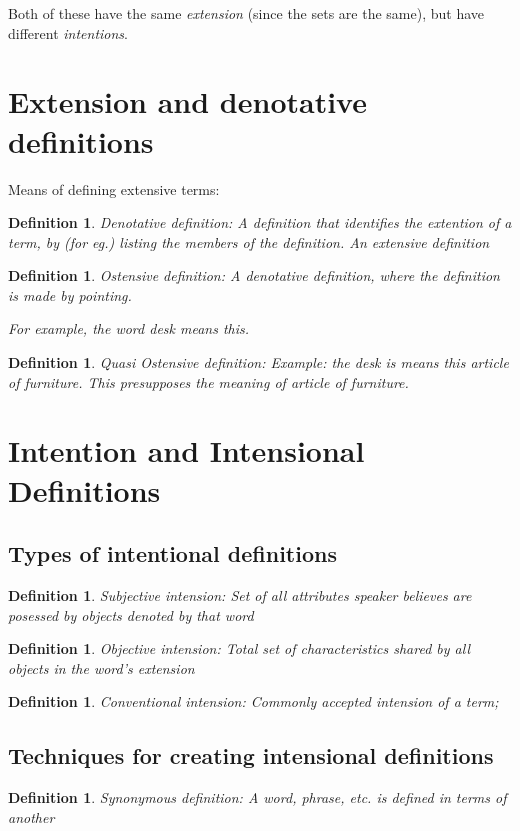 \documentclass[5pt]{book}
\newtheorem{definition}[theorem]{Definition}
\begin{document}
Both of these have the same \textit{extension} (since the sets are the
same), but have different \textit{intentions}.

\section{Extension and denotative definitions}
Means of defining extensive terms:
\begin{definition}Denotative definition: A definition that identifies
    the extention of a term, by (for eg.) listing the members
    of the definition. An extensive definition
\end{definition}


\begin{definition}Ostensive definition: A denotative definition, where
    the definition is made by pointing.

    For example, the word desk means \textit{this}.
\end{definition}

\begin{definition}Quasi Ostensive definition:
    Example: the desk is means \textit{this} article of furniture. This
    presupposes the meaning of \textit{article of furniture}.
\end{definition}

\section{Intention and Intensional Definitions}
\subsection{Types of intentional definitions}
\begin{definition}Subjective intension: Set of all attributes speaker
    believes are posessed by objects denoted by that word
\end{definition}

\begin{definition}Objective intension: Total set of characteristics
    shared by all objects in the word's extension
\end{definition}

\begin{definition}
    Conventional intension: Commonly accepted intension of a term; 
\end{definition}

\subsection{Techniques for creating intensional definitions}
\begin{definition}Synonymous definition: A word, phrase, etc. is defined
    in terms of another
\end{definition}
\end{document}
